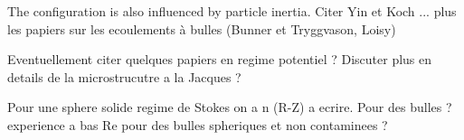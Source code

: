 The configuration is also influenced by particle inertia. Citer Yin et Koch ... plus les papiers sur les ecoulements à bulles (Bunner et Tryggvason, Loisy)

Eventuellement citer quelques papiers en regime potentiel ? Discuter plus en details de la microstrucutre a la Jacques ?

Pour une sphere solide regime de Stokes on a n (R-Z) a ecrire. Pour des bulles ? experience a bas Re pour des bulles spheriques et non contaminees ?






